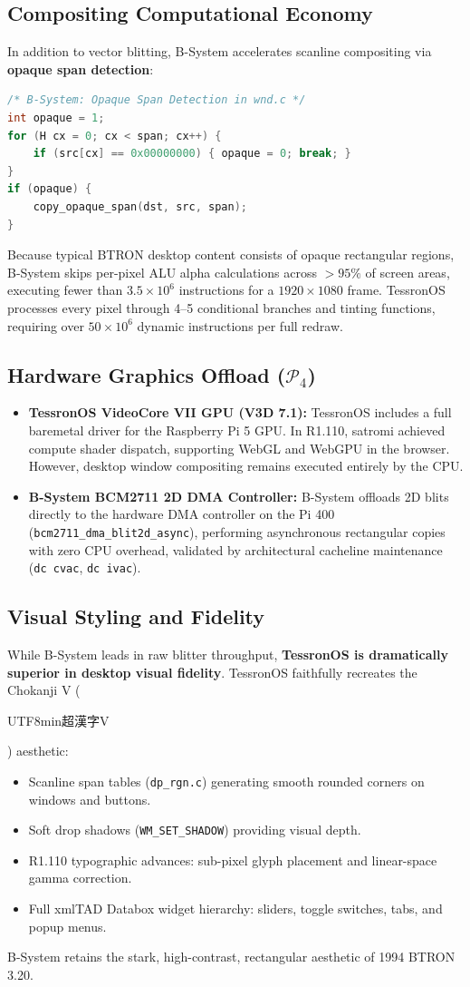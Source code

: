 \documentclass[10pt,journal,compsoc,twocolumn]{article}
\newcommand{\ja}[1]{\begin{CJK*}{UTF8}{min}#1\end{CJK*}}
\begin{document}
\subsection{Compositing Computational Economy}
In addition to vector blitting, B-System accelerates scanline compositing via \textbf{opaque span detection}:
\begin{lstlisting}[language=C]
/* B-System: Opaque Span Detection in wnd.c */
int opaque = 1;
for (H cx = 0; cx < span; cx++) {
    if (src[cx] == 0x00000000) { opaque = 0; break; }
}
if (opaque) {
    copy_opaque_span(dst, src, span);
}
\end{lstlisting}
Because typical BTRON desktop content consists of opaque rectangular regions, B-System skips per-pixel ALU alpha calculations across $> 95\%$ of screen areas, executing fewer than $3.5 \times 10^6$ instructions for a $1920 \times 1080$ frame. TessronOS processes every pixel through 4--5 conditional branches and tinting functions, requiring over $50 \times 10^6$ dynamic instructions per full redraw.

\subsection{Hardware Graphics Offload ($\mathcal{P}_4$)}
\begin{itemize}[leftmargin=*]
    \item \textbf{TessronOS VideoCore VII GPU (V3D 7.1):} TessronOS includes a full baremetal driver for the Raspberry Pi 5 GPU. In R1.110, satromi achieved compute shader dispatch, supporting WebGL and WebGPU in the browser. However, desktop window compositing remains executed entirely by the CPU.
    \item \textbf{B-System BCM2711 2D DMA Controller:} B-System offloads 2D blits directly to the hardware DMA controller on the Pi 400 (\texttt{bcm2711\_dma\_blit2d\_async}), performing asynchronous rectangular copies with zero CPU overhead, validated by architectural cacheline maintenance (\texttt{dc cvac}, \texttt{dc ivac}).
\end{itemize}

\subsection{Visual Styling and Fidelity}
While B-System leads in raw blitter throughput, \textbf{TessronOS is dramatically superior in desktop visual fidelity}. TessronOS faithfully recreates the Chokanji V (\ja{超漢字V}) aesthetic:
\begin{itemize}[leftmargin=*]
    \item Scanline span tables (\texttt{dp\_rgn.c}) generating smooth rounded corners on windows and buttons.
    \item Soft drop shadows (\texttt{WM\_SET\_SHADOW}) providing visual depth.
    \item R1.110 typographic advances: sub-pixel glyph placement and linear-space gamma correction.
    \item Full xmlTAD Databox widget hierarchy: sliders, toggle switches, tabs, and popup menus.
\end{itemize}
B-System retains the stark, high-contrast, rectangular aesthetic of 1994 BTRON 3.20.
\end{document}
